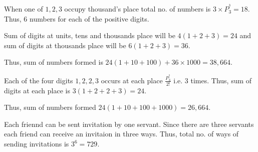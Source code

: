   When one of $1, 2, 3$ occupy thousand's place total no. of numbers is $3\times P_3^^3 = 18$. Thus, $6$
  numbers for each of the positive digits.

  Sum of digits at units, tens and thousands place will be $4(1 + 2 + 3) = 24$ and sum of digits at
  thousands place will be $6(1 + 2 + 3) = 36$.

  Thus, sum of numbers formed is $24(1 + 10 + 100) + 36\times 1000 = 38,664$.
\item Each of the four digits $1, 2, 2, 3$ occurs at each place $\frac{P_3^^3}{2!}$ i.e. $3$ times. Thus,
  sum of digits at each place is $3(1 + 2 + 2 + 3) = 24$.

  Thus, sum of numbers formed $24(1 + 10 + 100 + 1000) = 26,664$.
\item Each friennd can be sent invitation by one servant. Since there are three servants each friend can
  receive an invitaion in three ways. Thus, total no. of ways of sending invitations is $3^6 = 729$.
\stopitemize